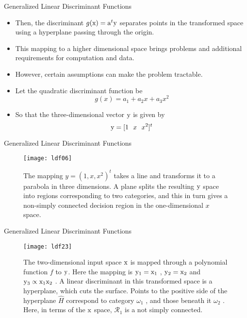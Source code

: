 \begin{frame}{Generalized Linear Discriminant Functions}
\begin{itemize}
\item Then, the discriminant $g({\rm x}) = {\rm a}^t {\rm y}$ separates points in the transformed space using a hyperplane passing through the origin.
\item This mapping to a higher dimensional space brings problems and additional requirements for computation and data.
\item However, certain assumptions can make the problem tractable.
\item Let the quadratic discriminant function be
\begin{equation}
g(x)=a_1+a_2x+a_3x^2 \nonumber
\end{equation}
\item So that the three-dimensional vector ${\rm y}$ is given by
\begin{equation}
{\rm y}=[1~~x~~x^2]^t \nonumber
\end{equation}
\end{itemize}
\end{frame}

\begin{frame}{Generalized Linear Discriminant Functions}
\begin{figure}
\texttt{[image: ldf06]}
\caption{The mapping $y = (1, x, x^2 )^t$ takes a line and transforms it to a parabola
in three dimensions. A plane splits the resulting ${\rm y}$ space into regions corresponding
to two categories, and this in turn gives a non-simply connected decision region in the
one-dimensional $x$ space.}
\end{figure}
\end{frame}

\begin{frame}{Generalized Linear Discriminant Functions}
\begin{figure}
\texttt{[image: ldf23]}
\caption{The two-dimensional input space ${\rm x}$ is mapped through a polynomial
function $f$ to ${\rm y}$. Here the mapping is ${\rm y}_1 = {\rm x}_1$ , ${\rm y}_2 = {\rm x}_2$ and ${\rm y}_3\propto {\rm x}_1 {\rm x}_2$ . A linear
discriminant in this transformed space is a hyperplane, which cuts the surface. Points to the positive side of the hyperplane $\hat{H}$ correspond to category $\omega_1$ , and those beneath
it $\omega_2$ . Here, in terms of the ${\rm x}$ space, $\mathcal{R}_1$ is a not simply connected.}
\end{figure}
\end{frame}

